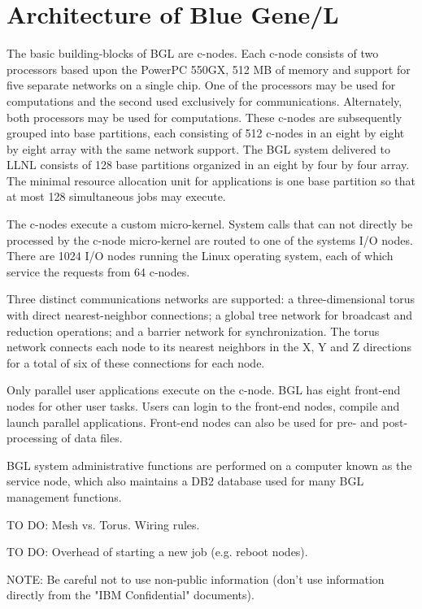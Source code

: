 \documentclass[10pt,onecolumn,times]{../common/llncs}
\begin{document}
{\section{Architecture of Blue Gene/L}

The basic building-blocks of BGL are c-nodes. 
Each c-node consists
of two processors based upon the PowerPC 550GX, 512 MB of memory 
and support for five separate networks on a single chip.
One of the processors may be used for computations and the 
second used exclusively for communications. 
Alternately, both processors may be used for computations. 
These c-nodes are subsequently grouped into base partitions, each consisting 
of 512 c-nodes in an eight by eight by eight array with the same 
network support.
The BGL system delivered to LLNL consists of 128 base 
partitions organized in an eight by four by four array.
The minimal resource allocation unit for applications is one 
base partition so that at most 128 simultaneous jobs may execute. 

The c-nodes execute a custom micro-kernel. 
System calls that can not directly be processed by the c-node 
micro-kernel are routed to one of the systems I/O nodes. 
There are 1024 I/O nodes running the Linux operating system, 
each of which service the requests from 64 c-nodes.

Three distinct communications networks are supported: 
a three-dimensional torus with direct nearest-neighbor connections;
a global tree network for broadcast and reduction operations; and 
a barrier network for synchronization. 
The torus network connects each node to 
its nearest neighbors in the X, Y and Z directions for a 
total of six of these connections for each node. 

Only parallel user applications execute on the c-node. 
BGL has eight front-end nodes for other user tasks. 
Users can login to the front-end nodes, compile and 
launch parallel applications. Front-end nodes can also
be used for pre- and post-processing of data files.

BGL system administrative functions are performed on a 
computer known as the service node, which also maintains 
a DB2 database used for many BGL management functions.

TO DO: Mesh vs. Torus.  Wiring rules.

TO DO: Overhead of starting a new job (e.g. reboot nodes).

NOTE: Be careful not to use non-public information (don't use 
information directly from the "IBM Confidential" documents).

}
\end{document}
